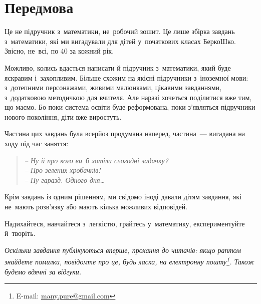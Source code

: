 \chapter*{Передмова}

Це не підручник з~математики, не~робочий зошит.
Це лише збірка завдань з~математики, які ми вигадували для дітей
у~початкових класах БеркоШко.
Звісно, не~всі, по 40 за кожний рік.

Можливо, колись вдасться написати й підручник з~математики,
який буде яскравим і~захопливим.
Більше схожим на якісні підручники з~іноземної мови: з~дотепними персонажами,
живими малюнками, цікавими завданнями, з~додатковою методичкою для вчителя.
Але наразі хочеться поділитися вже тим, що маємо.
Бо поки система освіти буде реформована, поки з’являться підручники
нового покоління, діти вже виростуть.

Частина цих завдань була всерйоз продумана наперед,
частина~--- вигадана на ходу під час заняття:
\begin{quote}
\itshape
-- Ну й про кого ви~б хотіли сьогодні задачку? \\
-- Про зелених хробачків! \\
-- Ну гаразд. Одного дня\ldots
\end{quote}

Крім завдань із одним рішенням, ми свідомо іноді давали дітям завдання,
які не~мають розв’язку або мають кілька можливих відповідей.

Надихайтеся, навчайтеся з~легкістю, грайтесь у~математику,
експериментуйте й~творіть. \smiley

\medskip
\medskip

\emph{\small
Оскільки завдання публікуються вперше, прохання до читачів:
якщо раптом знайдете помилки,
повідомте про це, будь ласка, на електронну пошту\footnote{
    E-mail: \href{mailto:many.pure@gmail.com}{many.pure@gmail.com}
}. Також будемо вдячні за відгуки.
}%
\smiley
